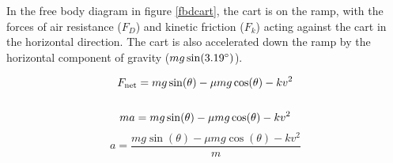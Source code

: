 In the free body diagram in figure \ref{fbdcart}, the cart is on the ramp, with the forces of air resistance ($F_{D}$) and kinetic friction ($F_{k}$) acting
against the cart in the horizontal direction. The cart is also accelerated down the ramp by the horizontal component of gravity ($mg\sin(3.19\degree)$). 

\begin{gather*}
  F_{\textup{net}} = mg\sin(\theta) - \mu mg\cos(\theta) - kv^2\\
  \\
  ma = mg\sin(\theta) - \mu mg\cos(\theta) - kv^2\\
\end{gather*}
\begin{equation}
  a = \frac{mg\sin(\theta) - \mu mg\cos(\theta) - kv^2}{m}
  \label{Eq:acceleration} %
\end{equation}


